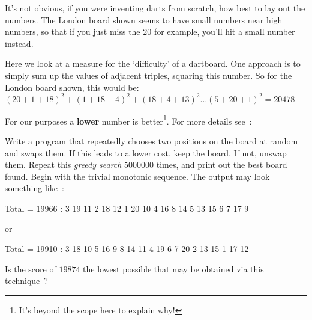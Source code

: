 


It's not obvious, if you were inventing darts from scratch, how best to
lay out the numbers. The London board shown seems to have small numbers near high numbers,
so that if you just miss the $20$ for example, you'll hit a small number instead.

Here we look at a measure for the `difficulty' of a dartboard.
One approach is to simply sum up the values of adjacent triples, squaring 
this number. So for the London board shown, this would be:
\begin{math}
(20+1+18)^2 + (1+18+4)^2 + (18+4+13)^2 \dots (5+20+1)^2 = 20478
\end{math}

For our purposes a {\bf lower} number is better\footnote{It's beyond
the scope here to explain why!}. For more details see~:

\begin{exercise}
Write a program that repeatedly chooses two
positions on the board at random and swaps them. If this leads to a lower cost,
keep the board. If not, unswap them. Repeat this {\it greedy search}
$5000000$ times, and print out the best board found.
Begin with the trivial monotonic sequence.
The output may look something like~:
\begin{terminaloutput}
Total = 19966 :  3 19 11  2 18 12  1 20 10  4 16  8
14  5 13 15  6  7 17  9 
\end{terminaloutput}
or
\begin{terminaloutput}
Total = 19910 :  3 18 10  5 16  9  8 14 11  4 19  6
7 20  2 13 15  1 17 12 
\end{terminaloutput}

Is the score of $19874$ the lowest possible that may be obtained via this technique~?
\end{exercise}

